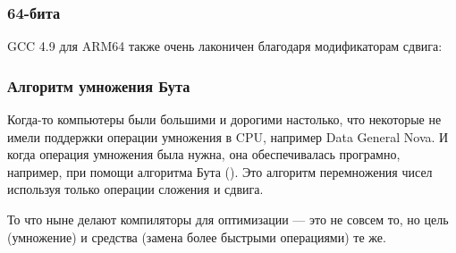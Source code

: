 \subsubsection{64-бита}







GCC 4.9 для ARM64 также очень лаконичен благодаря модификаторам сдвига:



\subsubsection{Алгоритм умножения Бута}

Когда-то компьютеры были большими и дорогими настолько, что некоторые не имели поддержки операции умножения
в \ac{CPU}, например Data General Nova.
И когда операция умножения была нужна, она обеспечивалась програмно, например, при помощи алгоритма Бута
().
Это алгоритм перемножения чисел используя только операции сложения и сдвига.

То что ныне делают компиляторы для оптимизации --- это не совсем то,
но цель (умножение) и средства (замена более быстрыми операциями) те же.

